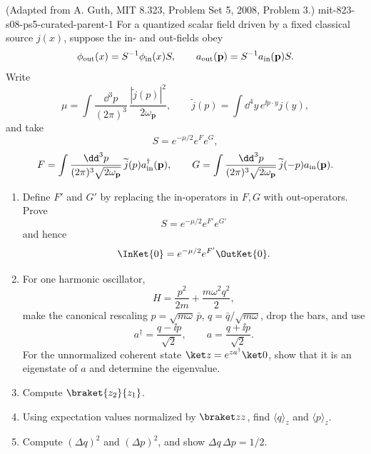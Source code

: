 \begin{enumerate}
  {(Adapted from A. Guth, MIT 8.323, Problem Set 5, 2008, Problem 3.)}
  {mit-823-s08-ps5-curated-parent-1}
For a quantized scalar field driven by a fixed classical source \(j(x)\),
suppose the in- and out-fields obey
\[
 \phi_{\rm out}(x)=S^{-1}\phi_{\rm in}(x)S,\qquad
 a_{\rm out}(\mathbf p)=S^{-1}a_{\rm in}(\mathbf p)S.
\]
Write
\[
 \mu=\int\frac{\dd^3p}{(2\pi)^3}\,
       \frac{|\widetilde j(p)|^2}{2\omega_{\mathbf p}},
 \qquad
 \widetilde j(p)=\int \dd^4y\,e^{\ii p\cdot y}j(y),
\]
and take
\[
 S=e^{-\mu/2}e^Fe^G,
\]
\[
 F=\int\frac{\dd^3p}{(2\pi)^3\sqrt{2\omega_{\mathbf p}}}\,
       \widetilde j(p)a_{\rm in}^\dagger(\mathbf p),
 \qquad
 G=\int\frac{\dd^3p}{(2\pi)^3\sqrt{2\omega_{\mathbf p}}}\,
       \widetilde j(-p)a_{\rm in}(\mathbf p).
\]
\begin{enumerate}
\item
Define \(F'\) and \(G'\) by replacing the in-operators in \(F,G\) with
out-operators.  Prove
\[
 S=e^{-\mu/2}e^{F'}e^{G'}
\]
and hence
\[
 \InKet{0}=e^{-\mu/2}e^{F'}\OutKet{0}.
\]
\item
For one harmonic oscillator,
\[
 H=\frac{p^2}{2m}+\frac{m\omega^2q^2}{2},
\]
make the canonical rescaling
\(p=\sqrt{m\omega}\,\bar p\),
\(q=\bar q/\sqrt{m\omega}\), drop the bars, and use
\[
 a^\dagger=\frac{q-\ii p}{\sqrt2},\qquad
 a=\frac{q+\ii p}{\sqrt2}.
\]
For the unnormalized coherent state
\(\ket z=e^{za^\dagger}\ket0\), show that it is an eigenstate of \(a\)
and determine the eigenvalue.
\item
Compute \(\braket{z_2}{z_1}\).
\item
Using expectation values normalized by \(\braket z z\), find
\(\langle q\rangle_z\) and \(\langle p\rangle_z\).
\item
Compute \((\Delta q)^2\) and \((\Delta p)^2\), and show
\(\Delta q\,\Delta p=1/2\).
\end{enumerate}


\end{enumerate}

